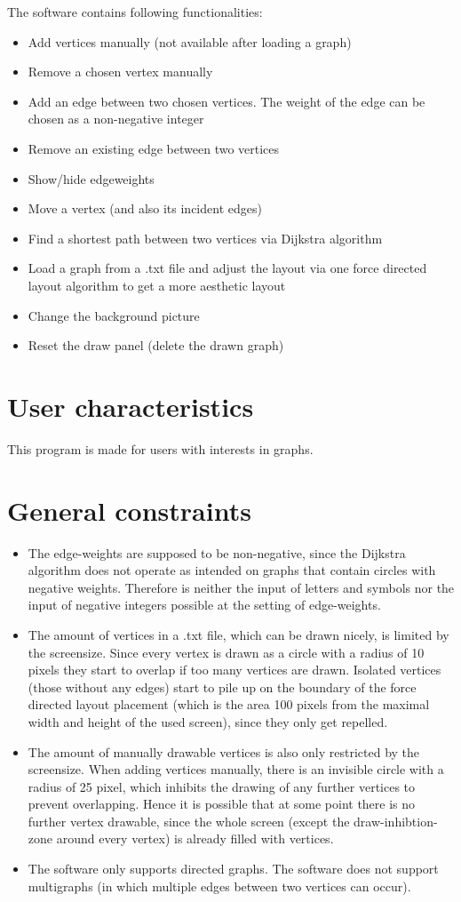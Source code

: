 \documentclass{article}
\begin{document}
The software contains following functionalities:
\begin{itemize}
\item Add vertices manually (not available after loading a graph)
\item Remove a chosen vertex manually
\item Add an edge between two chosen vertices. The weight of the edge can be chosen as a non-negative integer
\item Remove an existing edge between two vertices
\item Show/hide edgeweights
\item Move a vertex (and also its incident edges)
\item Find a shortest path between two vertices via Dijkstra algorithm
\item Load a graph from a .txt file and adjust the layout via one force directed layout algorithm to get a more aesthetic layout
\item Change the background picture
\item Reset the draw panel (delete the drawn graph)
\end{itemize}

\section{User characteristics}
This program is made for users with interests in graphs.

\section{General constraints}
\begin{itemize}
\item The edge-weights are supposed to be non-negative, since the Dijkstra algorithm does not operate as intended on graphs that contain circles with negative weights. Therefore is neither the input of letters and symbols nor the input of negative integers possible at the setting of edge-weights.
\item The amount of vertices in a .txt file, which can be drawn nicely, is limited by the screensize. Since every vertex is drawn as a circle with a radius of 10 pixels they start to overlap if too many vertices are drawn. Isolated vertices (those without any edges) start to pile up on the boundary of the force directed layout placement (which is the area 100 pixels from the maximal width and height of the used screen), since they only get repelled.
\item The amount of manually drawable vertices is also only restricted by the screensize. When adding vertices manually, there is an invisible circle with a radius of 25 pixel, which inhibits the drawing of any further vertices to prevent overlapping. Hence it is possible that at some point there is no further vertex drawable, since the whole screen (except the draw-inhibtion-zone around every vertex) is already filled with vertices.
\item The software only supports directed graphs. The software does not support multigraphs (in which multiple edges between two vertices can occur).
\end{itemize}
\end{document}
